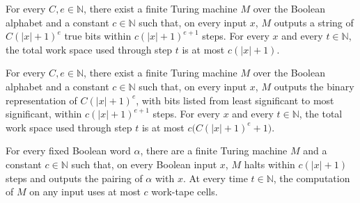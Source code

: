 \begin{theorem}
\label{Turing.FinTM.computesFunInTime_polyUnary_spaceUsed}
\leanok
{}
For every $C,e\in\mathbb{N}$, there exist a finite Turing machine $M$ over the Boolean
alphabet and a constant $c\in\mathbb{N}$ such that, on every input $x$, $M$ outputs a
string of $C(|x|+1)^e$ true bits within $c(|x|+1)^{e+1}$ steps. For every $x$ and every
$t\in\mathbb{N}$, the total work space used through step $t$ is at most $c(|x|+1)$.
\end{theorem}

\begin{theorem}
\label{Turing.FinTM.computesFunInTime_polyBits_spaceUsed}
\leanok
{}
For every $C,e\in\mathbb{N}$, there exist a finite Turing machine $M$ over the Boolean
alphabet and a constant $c\in\mathbb{N}$ such that, on every input $x$, $M$ outputs the
binary representation of $C(|x|+1)^e$, with bits listed from least significant to most
significant, within $c(|x|+1)^{e+1}$ steps. For every $x$ and every $t\in\mathbb{N}$,
the total work space used through step $t$ is at most $c\bigl(C(|x|+1)^e+1\bigr)$.
\end{theorem}

\begin{theorem}
\label{Turing.FinTM.computesFunInTime_pairEncodeFixed_spaceUsed}
\leanok
{}
For every fixed Boolean word $\alpha$, there are a finite Turing machine $M$ and a
constant $c\in\mathbb{N}$ such that, on every Boolean input $x$, $M$ halts within
$c(|x|+1)$ steps and outputs the pairing of $\alpha$ with $x$. At every time
$t\in\mathbb{N}$, the computation of $M$ on any input uses at most $c$ work-tape cells.
\end{theorem}


